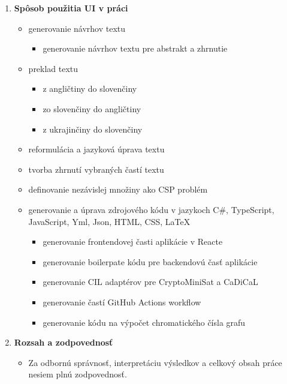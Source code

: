 \begin{enumerate}
    \item \textbf{Spôsob použitia UI v práci}
          \begin{itemize}
              \item{generovanie návrhov textu}
                    \begin{itemize}
                        \item{generovanie návrhov textu pre abstrakt a zhrnutie}
                    \end{itemize}
              \item{preklad textu}
                    \begin{itemize}
                        \item{z angličtiny do slovenčiny}
                        \item{zo slovenčiny do angličtiny}
                        \item{z ukrajinčiny do slovenčiny}
                    \end{itemize}
              \item{reformulácia a jazyková úprava textu}
              \item{tvorba zhrnutí vybraných častí textu}
              \item{definovanie nezávislej množiny ako CSP problém}
              \item{generovanie a úprava zdrojového kódu v jazykoch C\#, TypeScript, JavaScript, Yml, Json, HTML, CSS, \LaTeX}
                    \begin{itemize}
                        \item{generovanie frontendovej časti aplikácie v Reacte}
                        \item{generovanie boilerpate kódu pre backendovú časť aplikácie}
                        \item{generovanie CIL adaptérov pre CryptoMiniSat a CaDiCaL}
                        \item{generovanie častí GitHub Actions workflow}
                        \item{generovanie kódu na výpočet chromatického čísla grafu}
                    \end{itemize}
          \end{itemize}

    \item \textbf{Rozsah a zodpovednosť}
          \begin{itemize}
              \item{Za odbornú správnosť, interpretáciu výsledkov a celkový obsah práce nesiem plnú zodpovednosť.}
          \end{itemize}
\end{enumerate}
